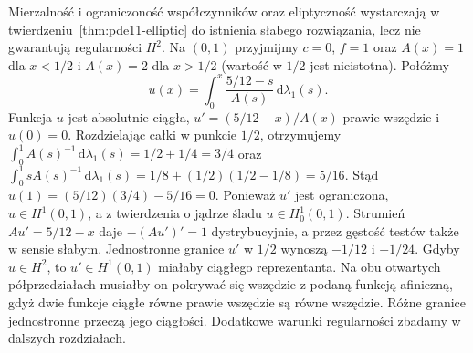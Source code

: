 \begin{uwaga}
Mierzalność i ograniczoność współczynników oraz eliptyczność
wystarczają w twierdzeniu~\ref{thm:pde11-elliptic} do istnienia
słabego rozwiązania, lecz nie gwarantują regularności $H^2$.
Na $(0,1)$ przyjmijmy $c=0$, $f=1$ oraz $A(x)=1$ dla $x<1/2$
i $A(x)=2$ dla $x>1/2$ (wartość w $1/2$ jest nieistotna).
Połóżmy
\[
 u(x)=\int_0^x\frac{5/12-s}{A(s)}\,\mathrm d\lambda_1(s).
\]
Funkcja $u$ jest absolutnie ciągła, $u'=(5/12-x)/A(x)$
prawie wszędzie i $u(0)=0$. Rozdzielając całki w punkcie $1/2$,
otrzymujemy $\int_0^1 A(s)^{-1}\,\mathrm d\lambda_1(s)
=1/2+1/4=3/4$ oraz
$\int_0^1 sA(s)^{-1}\,\mathrm d\lambda_1(s)
=1/8+(1/2)(1/2-1/8)=5/16$.
Stąd $u(1)=(5/12)(3/4)-5/16=0$.
Ponieważ $u'$ jest ograniczona, $u\in H^1(0,1)$,
a z twierdzenia o jądrze śladu $u\in H_0^1(0,1)$.
Strumień $Au'=5/12-x$ daje $-(Au')'=1$ dystrybucyjnie,
a przez gęstość testów także w sensie słabym.
Jednostronne granice $u'$ w $1/2$ wynoszą $-1/12$ i $-1/24$.
Gdyby $u\in H^2$, to $u'\in H^1(0,1)$ miałaby ciągłego
reprezentanta. Na obu otwartych półprzedziałach musiałby on
pokrywać się wszędzie z podaną funkcją afiniczną, gdyż dwie
funkcje ciągłe równe prawie wszędzie są równe wszędzie.
Różne granice jednostronne przeczą jego ciągłości.
Dodatkowe warunki regularności zbadamy w dalszych rozdziałach.
\end{uwaga}

